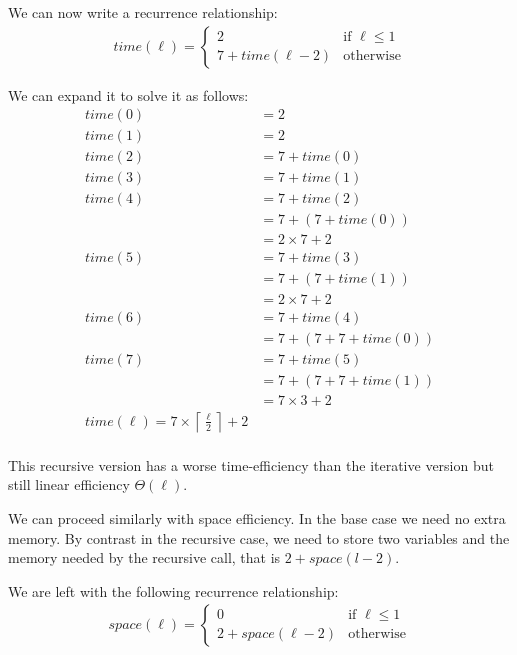 \documentclass[11pt]{article}
\begin{document}
We can now write a recurrence relationship:
\begin{align*}
  time(\ell) = \begin{cases}
      2 & \text{if } \ell \leq 1 \\
      7 + time(\ell-2) &  \text{otherwise}
  \end{cases}
\end{align*}

We can expand it to solve it as follows:
\begin{align*}
    time(0) &= 2 \\
    time(1) &= 2 \\
    time(2) &= 7 + time(0) \\
    time(3) &= 7 + time(1) \\
    time(4) &= 7 + time(2) \\
            &= 7 + (7 + time(0)) \\
            &= 2 \times 7 + 2 \\
    time(5) &= 7 + time(3) \\
            &= 7 + (7 + time(1)) \\
            &= 2 \times 7 + 2 \\
    time(6) &= 7 + time(4) \\
            &= 7 + (7 + 7 + time(0)) \\
    time(7) &= 7 + time(5) \\
            &= 7 + (7 + 7 + time(1)) \\
            &= 7 \times 3 + 2 \\
    time(\ell) = 7 \times \left\lceil \frac{\ell}{2} \right\rceil + 2 \\
\end{align*}

This recursive version has a worse time-efficiency than the
iterative version but still linear efficiency \(\Theta(\ell)\).

We can proceed similarly with space efficiency. In the base case we
need no extra memory. By contrast in the recursive case, we need to
store two variables and the memory needed by the recursive call,
that is \(2 + space(l-2)\).

We are left with the following recurrence relationship:
\begin{align*}
  space(\ell) = \begin{cases}
      0 & \text{if } \ell \leq 1 \\
      2 + space(\ell-2) &  \text{otherwise}
  \end{cases}
\end{align*}
\end{document}

